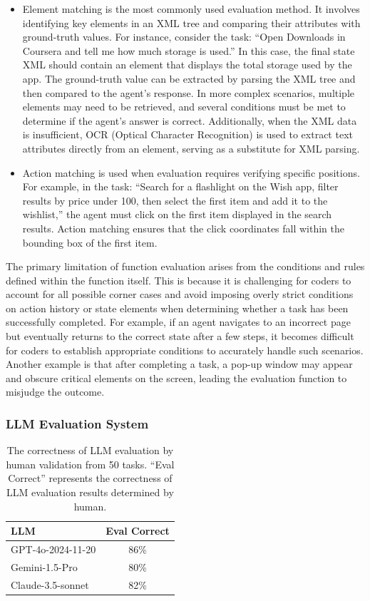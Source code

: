 \documentclass[11pt]{article}
\begin{document}
\begin{itemize}[leftmargin=2mm]
    \item Element matching is the most commonly used evaluation method. It involves identifying key elements in an XML tree and comparing their attributes with ground-truth values. For instance, consider the task: ``Open Downloads in Coursera and tell me how much storage is used.'' In this case, the final state XML should contain an element that displays the total storage used by the app. The ground-truth value can be extracted by parsing the XML tree and then compared to the agent's response. In more complex scenarios, multiple elements may need to be retrieved, and several conditions must be met to determine if the agent's answer is correct. Additionally, when the XML data is insufficient, OCR (Optical Character Recognition) is used to extract text attributes directly from an element, serving as a substitute for XML parsing.
    \item Action matching is used when evaluation requires verifying specific positions. For example, in the task: ``Search for a flashlight on the Wish app, filter results by price under 100, then select the first item and add it to the wishlist,'' the agent must click on the first item displayed in the search results. Action matching ensures that the click coordinates fall within the bounding box of the first item.
\end{itemize}

The primary limitation of function evaluation arises from the conditions and rules defined within the function itself. This is because it is challenging for coders to account for all possible corner cases and avoid imposing overly strict conditions on action history or state elements when determining whether a task has been successfully completed. For example, if an agent navigates to an incorrect page but eventually returns to the correct state after a few steps, it becomes difficult for coders to establish appropriate conditions to accurately handle such scenarios. Another example is that after completing a task, a pop-up window may appear and obscure critical elements on the screen, leading the evaluation function to misjudge the outcome.


\subsubsection{LLM Evaluation System}
\label{sec:llm-eval}

\begin{table}
    \centering
    \begin{tabular}{l c}
    \toprule
        LLM & Eval Correct \\
        \midrule
        GPT-4o-2024-11-20 & 86\% \\
        Gemini-1.5-Pro & 80\% \\
        Claude-3.5-sonnet & 82\% \\
        \bottomrule
    \end{tabular}
    \caption{The correctness of LLM evaluation by human validation from 50 tasks. ``Eval Correct'' represents the correctness of LLM evaluation results determined by human.}
    \label{tab:gpt-gemini-eval}
\end{table}
\end{document}
